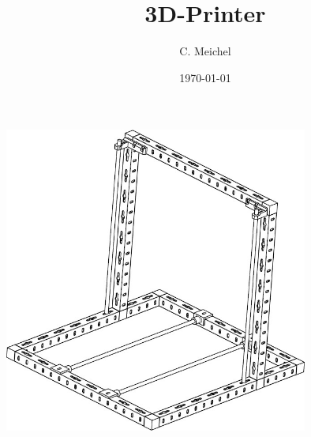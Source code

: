 \documentclass[a4paper,12pt]{article}%
\author{C. Meichel}%
\title{3D-Printer}%
\date{\today}%
\begin{document}
%
\maketitle%
\includegraphics[width=10cm]{img/frame.jpg}%
\clearpage%
\tableofcontents%
\clearpage%
%
%
%
%
%
\end{document}
